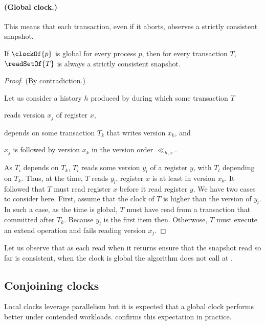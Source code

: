 \paragraph{(Global clock.)}

This means that each transaction, even if it aborts, observes a strictly consistent snapshot.

\begin{proposition}
  If $\clockOf{p}$ is global for every process $p$, then for every transaction $T$, $\readSetOf{T}$ is always a strictly consistent snapshot.
\end{proposition}

\begin{proof}
  (By contradiction.)
  
  Let us consider a history $h$ produced by  during which some transaction $T$
  \begin{inparaenum}[\em(i)]
  \item reads version $x_j$ of register $x$,
  \item depends on some transaction $T_k$ that writes version $x_k$, and
  \item $x_j$ is followed by version $x_k$ in the version order $\ll_{h,x}$.
  \end{inparaenum}

  As $T_i$ depends on $T_k$, $T_i$ reads some version $y_l$ of a register $y$, with $T_l$ depending on $T_k$.
  Thus, at the time, $T$ reads $y_l$, register $x$ is at least in version $x_k$.
  It followed that $T$ must read register $x$ before it read register $y$.
  We have two cases to consider here.
  First, assume that the clock of $T$ is higher than the version of $y_l$.
  In such a case, as the time is global, $T$ must have read from a transaction that committed after $T_k$.
  Because $y_l$ is the first item then.
  Otherwose, $T$ must execute an extend operation and fails reading version $x_j$.  
\end{proof}

Let us observe that as each read when it returns ensure that the snapshot read so far is consistent, when the clock is global the algorithm does not call \stmExtend{} at .

\subsection{Conjoining clocks}

Local clocks leverage parallelism but it is expected that a global clock performs better under contended workloads.
 confirms this expectation in practice.

